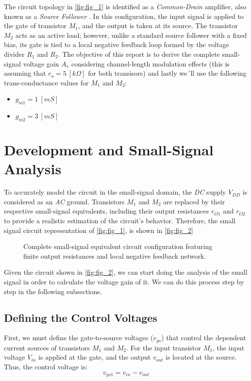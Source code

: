 \documentclass[12pt,a4paper]{article}
\begin{document}
The circuit topology in \autoref{fig:fig_1} is identified as a \textit{Common-Drain} amplifier, also known as a \textit{Source Follower} \cite[p. 331]{b1}. In this configuration, the input signal is applied to the gate of transistor $M_{1}$, and the output is taken at its source. The transistor $M_{2}$ acts as an active load; however, unlike a standard source follower with a fixed bias, its gate is tied to a local negative feedback loop formed by the voltage divider $R_{1}$ and $R_{2}$. The objective of this report is to derive the complete small-signal voltage gain $A_{v}$ considering channel-length modulation effects (this is assuming that $r_{o} = 5 \ [k\Omega]$ for both transisors) and lastly we´ll use the following trans-conductance values for $M_{1}$ and $M_{2}$:
\begin{itemize}
    \item $g_{m1} = 1 \ [mS]$
    \item $g_{m2} = 3 \ [mS]$
\end{itemize}



\section{Development and Small-Signal Analysis}
To accurately model the circuit in the small-signal domain, the \textit{DC} supply $V_{DD}$ is considered as an \textit{AC} ground. Transistors $M_{1}$ and $M_{2}$ are replaced by their respective small-signal equivalents, including their output resistances $r_{O1}$ and $r_{O2}$ to provide a realistic estimation of the circuit's behavior. Therefore, the small signal circuit representation of \autoref{fig:fig_1}, is shown in \autoref{fig:fig_2}
\begin{figure}[H]
    \centering
    
    \caption{Complete small-signal equivalent circuit configuration featuring finite output resistances and local negative feedback network.}
    \label{fig:fig_2}
\end{figure}

Given the circuit shown in \autoref{fig:fig_2}, we can start doing the analysis of the small signal in order to calculate the voltage gain of it. We can do this process step by step in the following subsections.


\subsection{Defining the Control Voltages}
First, we must define the gate-to-source voltages ($v_{gs}$) that control the dependent current sources of transistors $M_{1}$ and $M_{2}$. For the input transistor $M_{1}$, the input voltage $V_{in}$ is applied at the gate, and the output $v_{out}$ is located at the source. Thus, the control voltage is:
\begin{equation}
    v_{gs1} = v_{in} - v_{out}
    \label{eq_1}
\end{equation}
\end{document}
